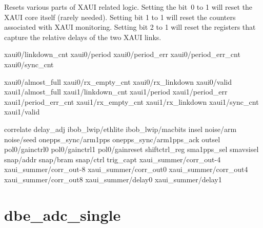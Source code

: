 \documentclass[12pt]{article}
\begin{document}
\begin{description}
  Resets various parts of XAUI related logic.  Setting the
bit~0 to 1 will reset the XAUI core itself (rarely needed).  Setting bit 1 to 1
will reset the counters associated with XAUI monitoring.  Setting bit 2 to 1
will reset the registers that capture the relative delays of the two XAUI
links.
\end{description}

{}xaui0/linkdown\_cnt
xaui0/period
xaui0/period\_err
xaui0/period\_err\_cnt
xaui0/sync\_cnt

{}xaui0/almost\_full
xaui0/rx\_empty\_cnt
xaui0/rx\_linkdown
xaui0/valid
xaui1/almost\_full
xaui1/linkdown\_cnt
xaui1/period
xaui1/period\_err
xaui1/period\_err\_cnt
xaui1/rx\_empty\_cnt
xaui1/rx\_linkdown
xaui1/sync\_cnt
xaui1/valid

{}correlate
delay\_adj
ibob\_lwip/ethlite
ibob\_lwip/macbits
insel
noise/arm
noise/seed
onepps\_sync/arm1pps
onepps\_sync/arm1pps\_ack
outsel
pol0/gainctrl0
pol0/gainctrl1
pol0/gainreset
shiftctrl\_reg
sma1pps\_sel
smavsisel
snap/addr
snap/bram
snap/ctrl
trig\_capt
xaui\_summer/corr\_out-4
xaui\_summer/corr\_out-8
xaui\_summer/corr\_out0
xaui\_summer/corr\_out4
xaui\_summer/corr\_out8
xaui\_summer/delay0
xaui\_summer/delay1


\section{dbe\_adc\_single}
\end{document}
